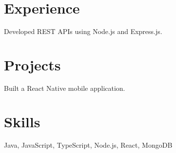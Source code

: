 \documentclass{article}
\begin{document}
\section{Experience}
Developed REST APIs using Node.js and Express.js.
\section{Projects}
Built a React Native mobile application.
\section{Skills}
Java, JavaScript, TypeScript, Node.js, React, MongoDB
\end{document}
